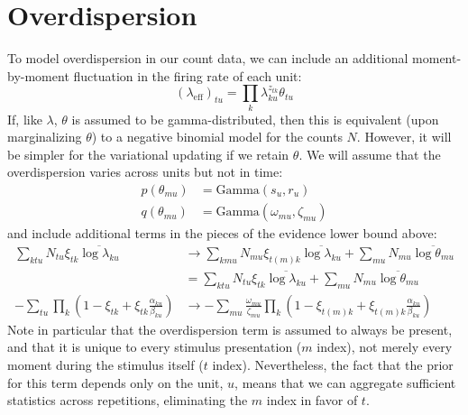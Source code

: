 \documentclass[11pt]{article}
\begin{document}
\section{Overdispersion}
To model overdispersion in our count data, we can include an additional moment-by-moment fluctuation in the firing rate of each unit:
\begin{equation}
    (\lambda_{\mathrm{eff}})_{tu} = \prod_k \lambda_{ku}^{z_{tk}}\theta_{tu}
\end{equation}
If, like $\lambda$, $\theta$ is assumed to be gamma-distributed, then this is equivalent (upon marginalizing $\theta$) to a negative binomial model for the counts $N$. However, it will be simpler for the variational updating if we retain $\theta$. We will assume that the overdispersion varies across units but not in time:
\begin{align}
    p(\theta_{mu}) &= \mathrm{Gamma}(s_u, r_u) \\
    q(\theta_{mu}) &= \mathrm{Gamma}(\omega_{mu}, \zeta_{mu})
\end{align}
and include additional terms in the pieces of the evidence lower bound above:
\begin{align}
    \sum_{ktu} N_{tu} \xi_{tk} \overline{\log \lambda_{ku}} &\rightarrow \sum_{kmu} N_{mu} \xi_{t(m)k} \overline{\log \lambda_{ku}} + \sum_{mu} N_{mu} \overline{\log \theta_{mu}} \\
    &= \sum_{ktu} N_{tu} \xi_{tk} \overline{\log \lambda_{ku}} + \sum_{mu} N_{mu} \overline{\log \theta_{mu}} \\
    - \sum_{tu} \prod_k \left( 1 - \xi_{tk} + \xi_{tk} \frac{\alpha_{ku}}{\beta_{ku}}\right) &\rightarrow - \sum_{mu} \frac{\omega_{mu}}{\zeta_{mu}} \prod_k \left( 1 - \xi_{t(m)k} + \xi_{t(m)k} \frac{\alpha_{ku}}{\beta_{ku}}\right)
\end{align}
Note in particular that the overdispersion term is assumed to always be present, and that it is unique to every stimulus presentation ($m$ index), not merely every moment during the stimulus itself ($t$ index). Nevertheless, the fact that the prior for this term depends only on the unit, $u$, means that we can aggregate sufficient statistics across repetitions, eliminating the $m$ index in favor of $t$.
\end{document}
